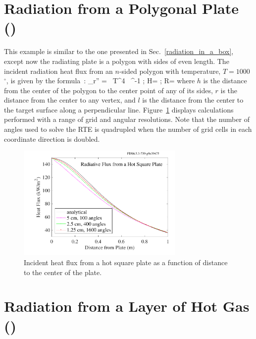 \documentclass[11pt]{book}
\begin{document}
\section{Radiation from a Polygonal Plate (\texorpdfstring{}{radiating\_polygon}) }
\label{radiating_polygon}

This example is similar to the one presented in Sec.~\ref{radiation_in_a_box}, except now the radiating plate is a polygon with sides of even length. The incident radiation heat flux from an $n$-sided polygon with temperature, $T=1000$~$^\circ$, is given by the formula~\cite{Siegel:1}:
\be
   \dq_{\rm r}'' = \sigma \, T^4 \,  \; \tan^{-1}  \quad ; \quad H= \quad ; \quad R=
   \label{plate_view_factor_eq}
\ee
where $h$ is the distance from the center of the polygon to the center point of any of its sides, $r$ is the distance from the center to any vertex, and $l$ is the distance from the center to the target surface along a perpendicular line. Figure~\ref{radiating_polygon_figure} displays calculations performed with a range of grid and angular resolutions. Note that the number of angles used to solve the RTE is quadrupled when the number of grid cells in each coordinate direction is doubled.

\begin{figure}[ht]
\centering
\includegraphics[height=2.2in]{SCRIPT_FIGURES/radiating_polygon_square}
\caption[The {\ct radiating\_polygon} test case]{Incident heat flux from a hot square plate as a function of distance to the center of the plate.}
\label{radiating_polygon_figure}
\end{figure}



\section{Radiation from a Layer of Hot Gas (\texorpdfstring{}{radiation\_plane\_layer})}
\label{radiation_plane_layer}
\end{document}
